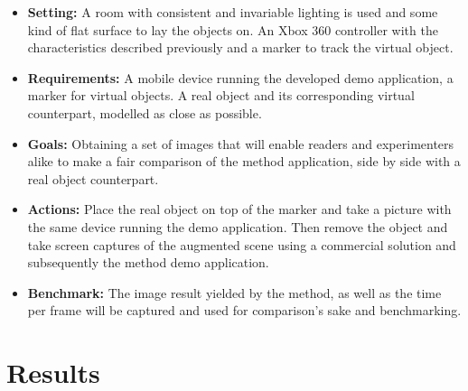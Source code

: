 \begin{itemize}
    \item \textbf{Setting:} A room with consistent and invariable lighting is used and some kind of flat surface to lay the objects on. An Xbox 360 controller with the characteristics described previously and a marker to track the virtual object.
    \item \textbf{Requirements:} A mobile device running the developed demo application, a marker for virtual objects. A real object and its corresponding virtual counterpart, modelled as close as possible. 
    \item \textbf{Goals:} Obtaining a set of images that will enable readers and experimenters alike to make a fair comparison of the method application, side by side with a real object counterpart.
    \item \textbf{Actions:} Place the real object on top of the marker and take a picture with the same device running the demo application. Then remove the object and take screen captures of the augmented scene using a commercial solution and subsequently the method demo application.
     \item \textbf{Benchmark:} The image result yielded by the method, as well as the  time per frame will be captured and used for comparison's sake and benchmarking.
\end{itemize}

\section{Results}

